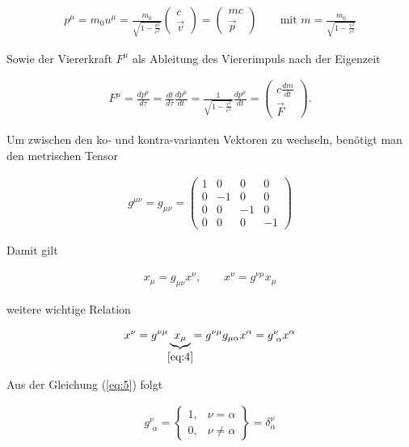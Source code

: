 \begin{align}
  \label{eq:9}
  p^\mu = m_0u^\mu = \frac{m_0}{\sqrt{1-\frac{v^2}{c^2}}}\begin{pmatrix}c\\\vec v \end{pmatrix} =\begin{pmatrix}mc\\\vec p \end{pmatrix}\qquad \text{mit }m= \frac{m_0}{\sqrt{1-\frac{v^2}{c^2}}}
\end{align}

Sowie der Viererkraft \(F^\mu\) als Ableitung des Viererimpuls nach der Eigenzeit

\begin{align}
  \label{eq:10}
  F^\mu = \frac{dp^\mu}{d\tau} = \frac{dt}{d\tau}\frac{dp^\mu}{dt} = \frac{1}{\sqrt{1-\frac{v^2}{c^2}}}\frac{dp^\mu}{dt} = \begin{pmatrix}c \frac{dm}{dt}\\\vec F \end{pmatrix}.
\end{align}


Um zwischen den ko- und kontra-varianten Vektoren zu wechseln, benötigt man den metrischen Tensor

\begin{align}
  \label{eq:3}
  g^{\mu\nu} = g_{\mu\nu} = \begin{pmatrix} 1&0&0&0 \\  0&-1&0&0 \\ 0&0&-1&0 \\ 0&0&0&-1  \end{pmatrix}
\end{align}


Damit gilt

\begin{align}
  \label{eq:4}
  x_{\mu} = g_{\mu\nu}x^\nu, \qquad x^\nu = g^{\nu\mu}x_\mu
\end{align}

weitere wichtige Relation

\begin{align}
  \label{eq:5}
  x^\nu = g^{\nu\mu}\underbr{x_\mu}_{\eqref{eq:4}} = g^{\nu\mu}  g_{\mu\alpha}x^\alpha = g^\nu_{\,\,\alpha}x^{\alpha}
\end{align}

Aus der Gleichung (\ref{eq:5}) folgt

\begin{align}
  \label{eq:6}
  g^\nu_{\,\,\alpha} = \begin{Bmatrix} 1,& \nu = \alpha\\ 0,&\nu\neq\alpha \end{Bmatrix} = \delta^\nu_{\alpha}
\end{align}

